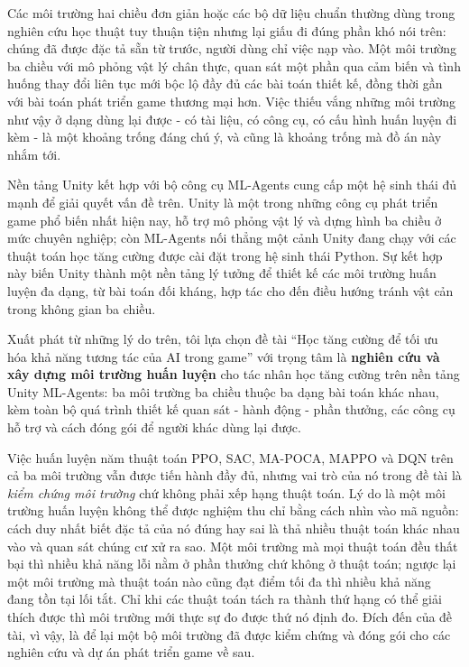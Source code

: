 \indent Các môi trường hai chiều đơn giản hoặc các bộ dữ liệu chuẩn thường dùng trong
nghiên cứu học thuật tuy thuận tiện nhưng lại giấu đi đúng phần khó nói trên: chúng đã
được đặc tả sẵn từ trước, người dùng chỉ việc nạp vào. Một môi trường ba chiều với mô
phỏng vật lý chân thực, quan sát một phần qua cảm biến và tình huống thay đổi liên tục
mới bộc lộ đầy đủ các bài toán thiết kế, đồng thời gần với bài toán phát triển game
thương mại hơn. Việc thiếu vắng những môi trường như vậy ở dạng dùng lại được - có tài
liệu, có công cụ, có cấu hình huấn luyện đi kèm - là một khoảng trống đáng chú ý, và
cũng là khoảng trống mà đồ án này nhắm tới.

\indent Nền tảng Unity kết hợp với bộ công cụ ML-Agents cung cấp một hệ sinh thái đủ
mạnh để giải quyết vấn đề trên. Unity là một trong những công cụ phát triển game phổ
biến nhất hiện nay, hỗ trợ mô phỏng vật lý và dựng hình ba chiều ở mức chuyên nghiệp;
còn ML-Agents nối thẳng một cảnh Unity đang chạy với các thuật toán học tăng cường
được cài đặt trong hệ sinh thái Python.
Sự kết hợp này biến Unity thành một nền tảng lý tưởng để thiết kế các môi trường huấn
luyện đa dạng, từ bài toán đối kháng, hợp tác cho đến điều hướng tránh vật cản trong
không gian ba chiều.

\indent Xuất phát từ những lý do trên, tôi lựa chọn đề tài ``Học tăng cường
để tối ưu hóa khả năng tương tác của AI trong game'' với trọng tâm là \textbf{nghiên
cứu và xây dựng môi trường huấn luyện} cho tác nhân học tăng cường trên nền tảng Unity
ML-Agents: ba môi trường ba chiều thuộc ba dạng bài toán khác nhau, kèm toàn bộ quá
trình thiết kế quan sát - hành động - phần thưởng, các công cụ hỗ trợ và cách đóng gói
để người khác dùng lại được.

\indent Việc huấn luyện năm thuật toán PPO, SAC, MA-POCA, MAPPO và DQN trên cả ba môi
trường vẫn được tiến hành đầy đủ, nhưng vai trò của nó trong đề tài là \textit{kiểm
chứng môi trường} chứ không phải xếp hạng thuật toán. Lý do là một môi trường huấn
luyện không thể được nghiệm thu chỉ bằng cách nhìn vào mã nguồn: cách duy nhất biết
đặc tả của nó đúng hay sai là thả nhiều thuật toán khác nhau vào và quan sát chúng cư
xử ra sao. Một môi trường mà mọi thuật toán đều thất bại thì nhiều khả năng lỗi nằm ở
phần thưởng chứ không ở thuật toán; ngược lại một môi trường mà thuật toán nào cũng đạt
điểm tối đa thì nhiều khả năng đang tồn tại lối tắt. Chỉ khi các thuật toán tách ra
thành thứ hạng có thể giải thích được thì môi trường mới thực sự đo được thứ nó định
đo. Đích đến của đề tài, vì vậy, là để lại một bộ môi trường đã được kiểm chứng và đóng
gói cho các nghiên cứu và dự án phát triển game về sau.

